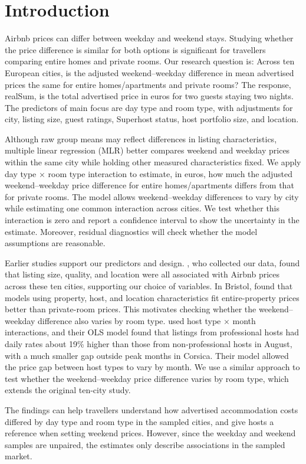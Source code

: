 \section{Introduction}

Airbnb prices can differ between weekday and weekend stays. Studying whether the price difference is similar for both options is significant for travellers comparing entire homes and private rooms. Our research question is: Across ten European cities, is the adjusted weekend--weekday difference in mean advertised prices the same for entire homes/apartments and private rooms? The response, realSum, is the total advertised price in euros for two guests staying two nights. The predictors of main focus are day type and room type, with adjustments for city, listing size, guest ratings, Superhost status, host portfolio size, and location.

Although raw group means may reflect differences in listing characteristics, multiple linear regression (MLR) better compares weekend and weekday prices within the same city while holding other measured characteristics fixed. We apply day type \(\times\) room type interaction to estimate, in euros, how much the adjusted weekend--weekday price difference for entire homes/apartments differs from that for private rooms. The model allows weekend--weekday differences to vary by city while estimating one common interaction across cities. We test whether this interaction is zero and report a confidence interval to show the uncertainty in the estimate. Moreover, residual diagnostics will check whether the model assumptions are reasonable.

Earlier studies support our predictors and design. \citet{gyodi2021}, who collected our data, found that listing size, quality, and location were all associated with Airbnb prices across these ten cities, supporting our choice of variables. In Bristol, \citet{voltes2020} found that models using property, host, and location characteristics fit entire-property prices better than private-room prices. This motivates checking whether the weekend--weekday difference also varies by room type. \citet{casamatta2022} used host type \(\times\) month interactions, and their OLS model found that listings from professional hosts had daily rates about 19\% higher than those from non-professional hosts in August, with a much smaller gap outside peak months in Corsica. Their model allowed the price gap between host types to vary by month. We use a similar approach to test whether the weekend--weekday price difference varies by room type, which extends the original ten-city study.

The findings can help travellers understand how advertised accommodation costs differed by day type and room type in the sampled cities, and give hosts a reference when setting weekend prices. However, since the weekday and weekend samples are unpaired, the estimates only describe associations in the sampled market.

